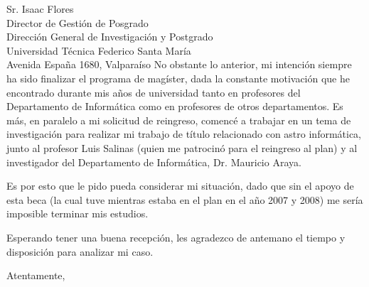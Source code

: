 \documentclass[12pt]{letter} %
\begin{document}
\begin{letter}{Sr. Isaac Flores \\
Director de Gestión de Posgrado \\
Dirección General de Investigación y Postgrado \\
Universidad Técnica Federico Santa María \\
Avenida España 1680, Valparaíso}
\noindent No obstante lo anterior, mi intención siempre ha sido finalizar el programa de magíster, dada la constante motivación que he encontrado durante mis años de universidad tanto en profesores del Departamento de Informática como en profesores de otros departamentos. Es más, en paralelo a mi solicitud de reingreso, comenc\'e a trabajar en un tema de investigación para realizar mi trabajo de título relacionado con astro informática, junto al profesor Luis Salinas (quien me patrocinó para el reingreso al plan) y al investigador del Departamento de Informática, Dr. Mauricio Araya.

\noindent Es por esto que le pido pueda considerar mi situación, dado que sin el apoyo de esta beca (la cual tuve mientras estaba en el plan en el año 2007 y 2008) me sería imposible terminar mis estudios.

Esperando tener una buena recepción, les agradezco de antemano el tiempo y disposición para analizar mi caso. 

\vspace*{2cm}

\closing{Atentamente,} 
 

 

\end{letter}
 
\end{document}
